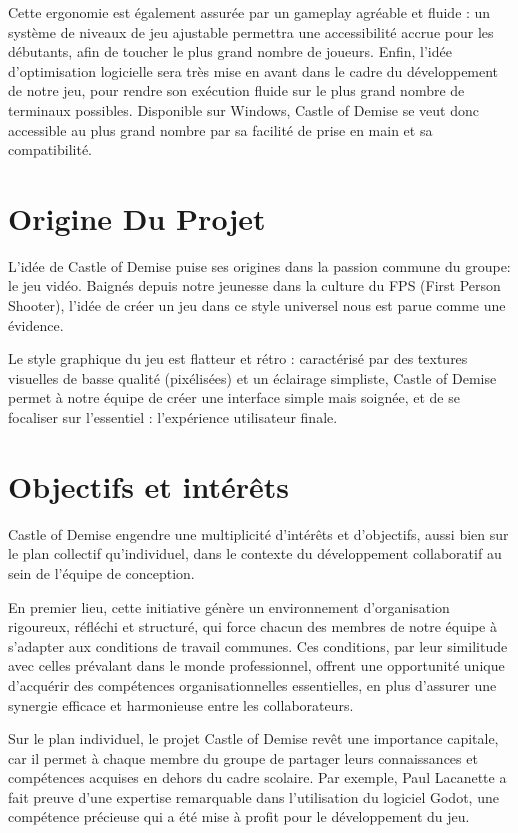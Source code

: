 \documentclass{report}
\begin{document}
Cette ergonomie est également assurée par un gameplay agréable et fluide : un système de niveaux de jeu ajustable permettra une accessibilité accrue pour les débutants, afin de toucher le plus grand nombre de joueurs. 
Enfin, l’idée d’optimisation logicielle sera très mise en avant dans le cadre du développement de notre jeu, pour rendre son exécution fluide sur le plus grand nombre de terminaux possibles. Disponible sur Windows, Castle of Demise se veut donc accessible au plus grand nombre par sa facilité de prise en main et sa compatibilité. \newline

\newpage
\section{Origine Du Projet}

L’idée de Castle of Demise puise ses origines dans la passion commune du groupe: le jeu vidéo. Baignés depuis notre jeunesse dans la culture du FPS (First Person Shooter), l’idée de créer un jeu dans ce style universel nous est parue comme une évidence. \newline

Le style graphique du jeu est flatteur et rétro : caractérisé par des textures visuelles de basse qualité (pixélisées) et un éclairage simpliste, Castle of Demise permet à notre équipe de créer une interface simple mais soignée, et de se focaliser sur l’essentiel : l’expérience utilisateur finale.


\section{Objectifs et intérêts}
Castle of Demise engendre une multiplicité d’intérêts et d’objectifs, aussi bien sur le plan collectif qu’individuel, dans le contexte du développement collaboratif au sein de l’équipe de conception. \newline 

 En premier lieu, cette initiative génère un environnement d’organisation rigoureux, réfléchi et structuré, qui force chacun des membres de notre équipe à s’adapter aux conditions de travail communes. Ces conditions, par leur similitude avec celles prévalant dans le monde professionnel, offrent une opportunité unique d’acquérir des compétences organisationnelles essentielles, en plus d’assurer une synergie efficace et harmonieuse entre les collaborateurs. \newline
 
Sur le plan individuel, le projet Castle of Demise revêt une importance capitale, car il permet à chaque membre du groupe de partager leurs connaissances et compétences acquises en dehors du cadre scolaire. Par exemple, Paul Lacanette a fait preuve d’une expertise remarquable dans l’utilisation du logiciel Godot, une compétence précieuse qui a été mise à profit pour le développement du jeu. \newline 
\end{document}
